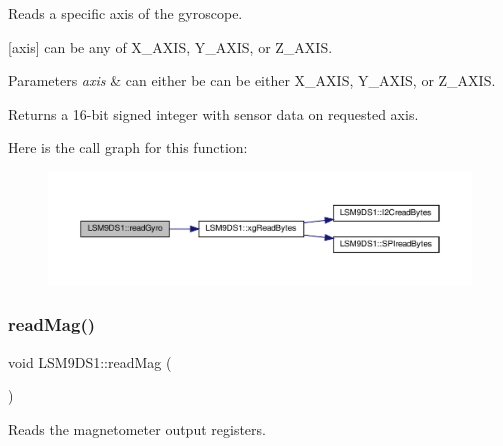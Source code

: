 Reads a specific axis of the gyroscope. 

\mbox{[}axis\mbox{]} can be any of X\+\_\+\+A\+X\+IS, Y\+\_\+\+A\+X\+IS, or Z\+\_\+\+A\+X\+IS.


\begin{DoxyParams}{Parameters}
{\em axis} & can either be can be either X\+\_\+\+A\+X\+IS, Y\+\_\+\+A\+X\+IS, or Z\+\_\+\+A\+X\+IS. \\
\hline
\end{DoxyParams}
\begin{DoxyReturn}{Returns}
a 16-\/bit signed integer with sensor data on requested axis. 
\end{DoxyReturn}
Here is the call graph for this function\+:\nopagebreak
\begin{figure}[H]
\begin{center}
\leavevmode
\includegraphics[width=350pt]{classLSM9DS1_adc1b37609a6c850328b16da4f911cefd_cgraph}
\end{center}
\end{figure}
\mbox{\label{classLSM9DS1_ae127cf75aa5f3c5421e49363795dcd38}} 
\subsubsection{\texorpdfstring{read\+Mag()}{readMag()}\hspace{0.1cm}{\footnotesize\ttfamily [1/2]}}
{\footnotesize\ttfamily void L\+S\+M9\+D\+S1\+::read\+Mag (\begin{DoxyParamCaption}{ }\end{DoxyParamCaption})}



Reads the magnetometer output registers. 

